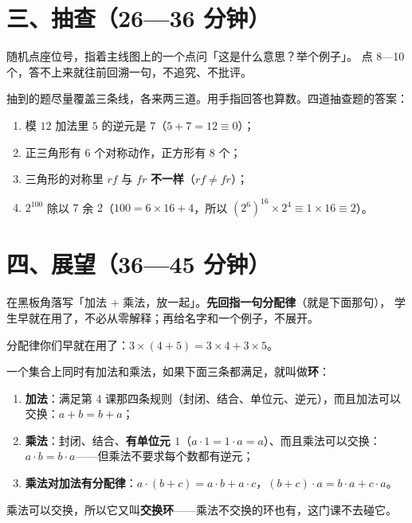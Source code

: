 \section*{三、抽查（26—36 分钟）}

\begin{caozuo}
  随机点座位号，指着主线图上的一个点问「这是什么意思？举个例子」。
  点 8—10 个，答不上来就往前回溯一句，不追究、不批评。
\end{caozuo}

\begin{zhu}
  抽到的题尽量覆盖三条线，各来两三道。用手指回答也算数。四道抽查题的答案：
  \begin{enumerate}
    \item 模 \(12\) 加法里 \(5\) 的逆元是 \textbf{\(7\)}（\(5+7=12\equiv0\)）；
    \item 正三角形有 \(6\) 个对称动作，正方形有 \textbf{\(8\)} 个；
    \item 三角形的对称里 \(rf\) 与 \(fr\) \textbf{不一样}（\(rf\neq fr\)）；
    \item \(2^{100}\) 除以 \(7\) 余 \textbf{\(2\)}（\(100=6\times16+4\)，所以
      \((2^{6})^{16}\times2^{4}\equiv1\times16\equiv2\)）。
  \end{enumerate}
\end{zhu}

\section*{四、展望（36—45 分钟）}

\begin{caozuo}
  在黑板角落写「加法 \(+\) 乘法，放一起」。\textbf{先回指一句分配律}（就是下面那句），
  学生早就在用了，不必从零解释；再给名字和一个例子，不展开。
\end{caozuo}

\noindent 分配律你们早就在用了：\(3\times(4+5)=3\times4+3\times5\)。

\begin{definition}[环]
  一个集合上同时有加法和乘法，如果下面三条都满足，就叫做\textbf{环}：
  \begin{enumerate}
    \item \textbf{加法}：满足第 4 课那四条规则（封闭、结合、单位元、逆元），而且加法可以交换：\(a+b=b+a\)；
    \item \textbf{乘法}：封闭、结合、\textbf{有单位元 \(1\)}（\(a\cdot1=1\cdot a=a\)）、而且乘法可以交换：\(a\cdot b=b\cdot a\)——但乘法不要求每个数都有逆元；
    \item \textbf{乘法对加法有分配律}：\(a\cdot(b+c)=a\cdot b+a\cdot c\)，\((b+c)\cdot a=b\cdot a+c\cdot a\)。
  \end{enumerate}
  乘法可以交换，所以它又叫\textbf{交换环}——乘法不交换的环也有，这门课不去碰它。
\end{definition}

